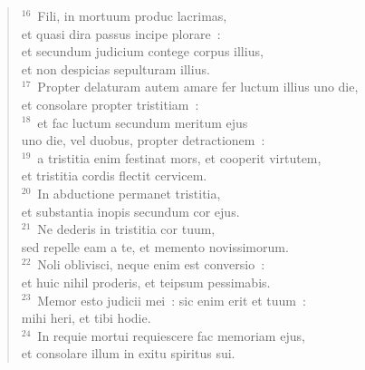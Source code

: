 \begin{verse}${}^{16}$~Fili, in mortuum produc lacrimas,\\ et quasi dira passus incipe plorare~:\\ et secundum judicium contege corpus illius,\\ et non despicias sepulturam illius.\\
${}^{17}$~Propter delaturam autem amare fer luctum illius uno die,\\ et consolare propter tristitiam~:\\
${}^{18}$~et fac luctum secundum meritum ejus\\ uno die, vel duobus, propter detractionem~:\\
${}^{19}$~a tristitia enim festinat mors, et cooperit virtutem,\\ et tristitia cordis flectit cervicem.\\
${}^{20}$~In abductione permanet tristitia,\\ et substantia inopis secundum cor ejus.\\
${}^{21}$~Ne dederis in tristitia cor tuum,\\ sed repelle eam a te, et memento novissimorum.\\
${}^{22}$~Noli oblivisci, neque enim est conversio~:\\ et huic nihil proderis, et teipsum pessimabis.\\
${}^{23}$~Memor esto judicii mei~: sic enim erit et tuum~:\\ mihi heri, et tibi hodie.\\
${}^{24}$~In requie mortui requiescere fac memoriam ejus,\\ et consolare illum in exitu spiritus sui.\end{verse}


